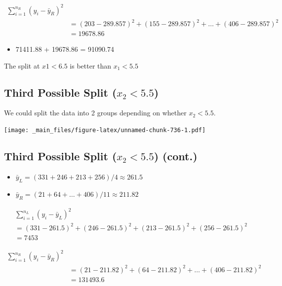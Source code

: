 \documentclass[]{book}
\providecommand{\tightlist}{%
  \setlength{\itemsep}{0pt}\setlength{\parskip}{0pt}}
\begin{document}
\[
\begin{aligned}
\displaystyle\sum_{i=1}^{n_R} (y_i -\bar{y}_R)^2 \\
& =(203-289.857)^2+(155-289.857)^2 + \ldots+(406-289.857)^2 \\
& =19678.86
\end{aligned}
\]

\begin{itemize}
\tightlist
\item
  71411.88 + 19678.86 = 91090.74
\end{itemize}

The split at \(x1 < 6.5\) is better than \(x_1<5.5\)

\subsection{\texorpdfstring{Third Possible Split
(\(x_2 < 5.5\))}{Third Possible Split (x\_2 \textless{} 5.5)}}\label{third-possible-split-x_2-5.5}

We could split the data into 2 groups depending on whether
\(x_2 < 5.5\).

\texttt{[image: \_main\_files/figure-latex/unnamed-chunk-736-1.pdf]}

\subsection{\texorpdfstring{Third Possible Split (\(x_2 < 5.5\))
(cont.)}{Third Possible Split (x\_2 \textless{} 5.5) (cont.)}}\label{third-possible-split-x_2-5.5-cont.}

\begin{itemize}
\tightlist
\item
  \(\bar{y}_L = (331+246+213+256)/4 \approx 261.5\)\\
\item
  \(\bar{y}_R = (21 + 64 + \ldots + 406)/11 \approx 211.82\)
\end{itemize}

\[
\begin{aligned}
& \displaystyle\sum_{i=1}^{n_L} (y_i -\bar{y}_L)^2  \\
& =(331-261.5)^2+(246-261.5)^2 + (213-261.5)^2+(256-261.5)^2 \\
& =7453
\end{aligned}
\]

\[
\begin{aligned}
\displaystyle\sum_{i=1}^{n_R} (y_i -\bar{y}_R)^2 \\
& =(21-211.82)^2+(64-211.82)^2 + \ldots+(406-211.82)^2 \\
& =131493.6
\end{aligned}
\]
\end{document}
